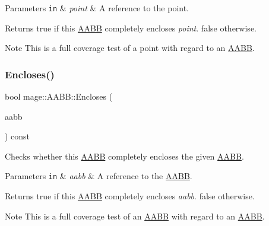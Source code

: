 \begin{DoxyParams}[1]{Parameters}
\mbox{\tt in}  & {\em point} & A reference to the point. \\
\hline
\end{DoxyParams}
\begin{DoxyReturn}{Returns}
{\ttfamily true} if this \hyperlink{structmage_1_1_a_a_b_b}{A\+A\+BB} completely encloses {\itshape point}. {\ttfamily false} otherwise. 
\end{DoxyReturn}
\begin{DoxyNote}{Note}
This is a full coverage test of a point with regard to an \hyperlink{structmage_1_1_a_a_b_b}{A\+A\+BB}. 
\end{DoxyNote}
\hypertarget{structmage_1_1_a_a_b_b_a06f017756a593461127613e4d77d0944}{}\label{structmage_1_1_a_a_b_b_a06f017756a593461127613e4d77d0944} 
\subsubsection{\texorpdfstring{Encloses()}{Encloses()}\hspace{0.1cm}{\footnotesize\ttfamily [3/4]}}
{\footnotesize\ttfamily bool mage\+::\+A\+A\+B\+B\+::\+Encloses (\begin{DoxyParamCaption}\item[{const \hyperlink{structmage_1_1_a_a_b_b}{A\+A\+BB} \&}]{aabb }\end{DoxyParamCaption}) const\hspace{0.3cm}{\ttfamily [noexcept]}}

Checks whether this \hyperlink{structmage_1_1_a_a_b_b}{A\+A\+BB} completely encloses the given \hyperlink{structmage_1_1_a_a_b_b}{A\+A\+BB}.


\begin{DoxyParams}[1]{Parameters}
\mbox{\tt in}  & {\em aabb} & A reference to the \hyperlink{structmage_1_1_a_a_b_b}{A\+A\+BB}. \\
\hline
\end{DoxyParams}
\begin{DoxyReturn}{Returns}
{\ttfamily true} if this \hyperlink{structmage_1_1_a_a_b_b}{A\+A\+BB} completely encloses {\itshape aabb}. {\ttfamily false} otherwise. 
\end{DoxyReturn}
\begin{DoxyNote}{Note}
This is a full coverage test of an \hyperlink{structmage_1_1_a_a_b_b}{A\+A\+BB} with regard to an \hyperlink{structmage_1_1_a_a_b_b}{A\+A\+BB}. 
\end{DoxyNote}
\hypertarget{structmage_1_1_a_a_b_b_ab906cfa784000d7fd49e9a405825e72f}{}\label{structmage_1_1_a_a_b_b_ab906cfa784000d7fd49e9a405825e72f} 
